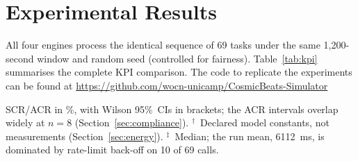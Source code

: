 \documentclass[conference,comsoc,twoside,caption=false]{IEEEtran}
\let\MYoriglatexcaption\caption
\renewcommand{\caption}[2][\relax]{\MYoriglatexcaption[#2]{#2}}
\theoremstyle{definition}
\begin{document}
\section{Experimental Results}
\label{sec:results}

All four engines process the identical sequence of 69 tasks
under the same 1{,}200-second window and random seed (controlled for fairness).
Table~\ref{tab:kpi} summarises the complete KPI comparison. The code to replicate the experiments can be found at \url{https://github.com/wocn-unicamp/CosmicBeats-Simulator}

\begin{table}[!t]
\centering
\caption{KPI Comparison across Orchestration Paradigms (69 tasks, 1{,}200\,s)}
\label{tab:kpi}

{\scriptsize
SCR/ACR in \%, with Wilson 95\%~CIs in brackets; the ACR intervals overlap
widely at $n=8$ (Section~\ref{sec:compliance}).
$^{\dagger}$~Declared model constants, not measurements
(Section~\ref{sec:energy}).
$^{\ddagger}$~Median; the run mean, \SI{6112}{\milli\second}, is dominated by
rate-limit back-off on 10 of 69 calls.}
\end{table}
\end{document}

